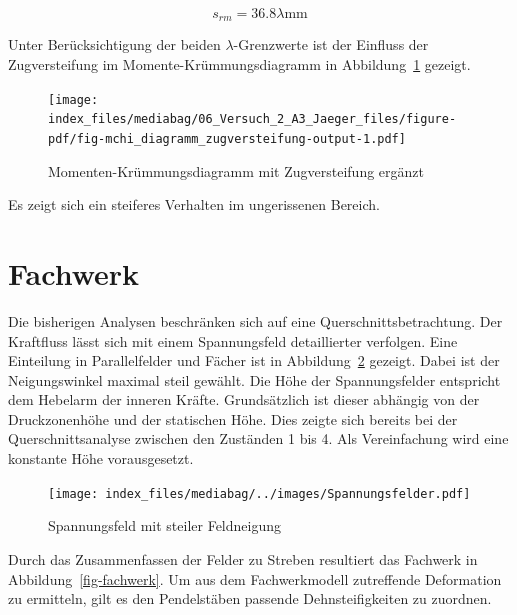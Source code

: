 \documentclass[
  letterpaper,
]{scrreprt}
\begin{document}
\begin{equation}s_{rm} = 36.8 \lambda \text{mm}\end{equation}

Unter Berücksichtigung der beiden \(\lambda\)-Grenzwerte ist der
Einfluss der Zugversteifung im Momente-Krümmungsdiagramm in
Abbildung~\ref{fig-mchi_diagramm_zugversteifung} gezeigt.

\begin{figure}[H]

{\centering \texttt{[image: index\_files/mediabag/06\_Versuch\_2\_A3\_Jaeger\_files/figure-pdf/fig-mchi\_diagramm\_zugversteifung-output-1.pdf]}

}

\caption{\label{fig-mchi_diagramm_zugversteifung}Momenten-Krümmungsdiagramm
mit Zugversteifung ergänzt}

\end{figure}

Es zeigt sich ein steiferes Verhalten im ungerissenen Bereich.

\hypertarget{fachwerk}{%
\section{Fachwerk}\label{fachwerk}}

Die bisherigen Analysen beschränken sich auf eine
Querschnittsbetrachtung. Der Kraftfluss lässt sich mit einem
Spannungsfeld detaillierter verfolgen. Eine Einteilung in Parallelfelder
und Fächer ist in Abbildung~\ref{fig-spannungsfelder_steil} gezeigt.
Dabei ist der Neigungswinkel maximal steil gewählt. Die Höhe der
Spannungsfelder entspricht dem Hebelarm der inneren Kräfte.
Grundsätzlich ist dieser abhängig von der Druckzonenhöhe und der
statischen Höhe. Dies zeigte sich bereits bei der Querschnittsanalyse
zwischen den Zuständen 1 bis 4. Als Vereinfachung wird eine konstante
Höhe vorausgesetzt.

\begin{figure}[H]

{\centering \texttt{[image: index\_files/mediabag/../images/Spannungsfelder.pdf]}

}

\caption{\label{fig-spannungsfelder_steil}Spannungsfeld mit steiler
Feldneigung}

\end{figure}

Durch das Zusammenfassen der Felder zu Streben resultiert das Fachwerk
in Abbildung~\ref{fig-fachwerk}. Um aus dem Fachwerkmodell zutreffende
Deformation zu ermitteln, gilt es den Pendelstäben passende
Dehnsteifigkeiten zu zuordnen.
\end{document}
